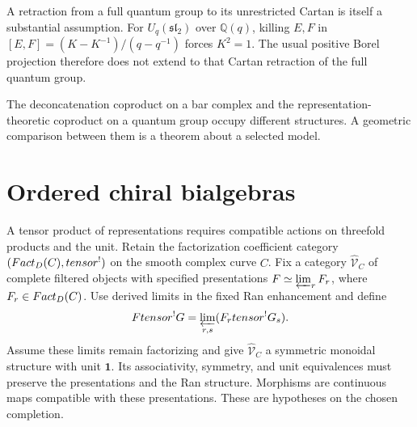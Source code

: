 A retraction from a full quantum group to its unrestricted Cartan is
itself a substantial assumption. For $U_q(\mathfrak{sl}_2)$ over
$\mathbb Q(q)$, killing $E,F$ in
$[E,F]=(K-K^{-1})/(q-q^{-1})$ forces $K^2=1$. The usual positive
Borel projection therefore does not extend to that Cartan retraction
of the full quantum group.

The deconcatenation coproduct on a bar complex and the representation-theoretic coproduct on a quantum group occupy different structures. A geometric comparison between them is a theorem about a selected model.

\section{Ordered chiral bialgebras}
A tensor product of representations requires compatible actions on
threefold products and the unit.
Retain the factorization coefficient category
$(Fact_D(C),tensor^!)$ on the smooth complex curve $C$.
Fix a category $\widehat{\mathcal V}_C$ of complete filtered objects
with specified presentations $F\simeq\varprojlim_r F_r$,
where $F_r\in Fact_D(C)$.
Use derived limits in the fixed Ran enhancement and define
\[
 Ftensor^{!}G
 =\varprojlim_{r,s}(F_rtensor^!G_s).
\]
Assume these limits remain factorizing and give
$\widehat{\mathcal V}_C$ a symmetric monoidal structure with unit $\mathbf1$.
Its associativity, symmetry, and unit equivalences must preserve
the presentations and the Ran structure.
Morphisms are continuous maps compatible with these presentations.
These are hypotheses on the chosen completion.

